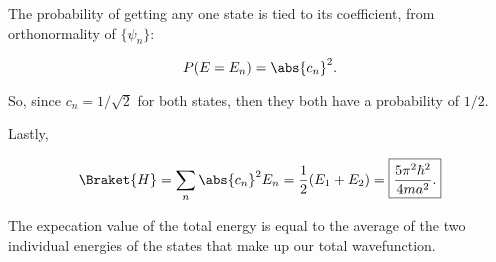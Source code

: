 \begin{parts}
The probability of getting any one state is tied to its coefficient, from orthonormality of $\{\psi_n\}$:

\begin{equation*}
    P(E = E_n) = \abs{c_n}^2.
\end{equation*}

So, since $c_n = 1/\sqrt{2}$ for both states, then they both have a probability of $1/2$.

Lastly, 

\begin{equation*}
    \Braket{H} = \sum_n \abs{c_n}^2 E_n = \frac{1}{2}(E_1+E_2) = \boxed{\frac{5\pi^2\hbar^2}{4ma^2}.}
\end{equation*}

The expecation value of the total energy is equal to the average of the two individual energies of the states that make up our total wavefunction.


\end{parts}